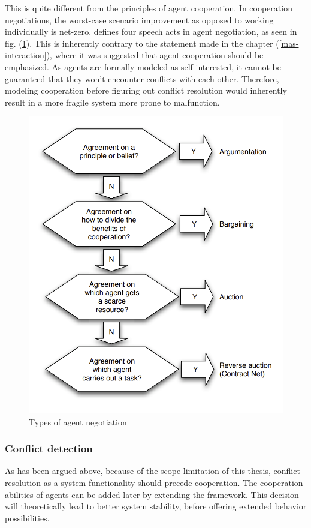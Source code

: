\documentclass[main.tex]{subfiles}
\begin{document}
This is quite different from the principles of agent cooperation. In cooperation negotiations, 
the worst-case scenario improvement as opposed to working individually is net-zero. \cite{Binder2022}
defines four speech acts in agent negotiation, as seen in fig. (\ref{fig-speech-acts}). This is 
inherently contrary to the statement made in the chapter (\ref{mas-interaction}), where it was suggested 
that agent cooperation should be emphasized. As agents are formally modeled as self-interested, 
it cannot be guaranteed that they won't encounter conflicts with each other. Therefore, modeling 
cooperation before figuring out conflict resolution would inherently result in a more fragile system 
more prone to malfunction. 

\begin{figure}[htbp]
    \centering
    \includegraphics[width=.8\textwidth]{speech-acts.png}
    \caption{Types of agent negotiation \cite{Binder2022}}
    \label{fig-speech-acts}
\end{figure}

\subsubsection{Conflict detection}

As has been argued above, because of the scope limitation of this thesis, 
conflict resolution as a system functionality should precede cooperation. The cooperation 
abilities of agents can be added later by extending the framework.
This decision will theoretically lead to better system stability, before offering extended
behavior possibilities. 
\end{document}
